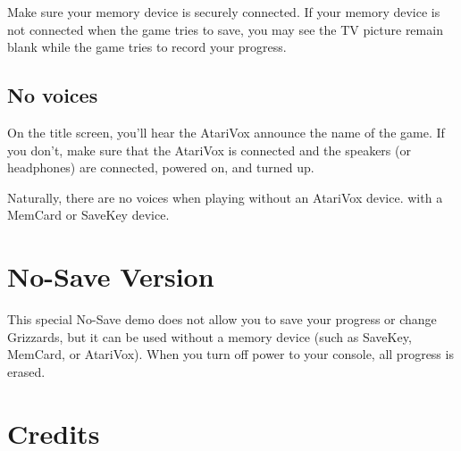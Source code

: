 \documentclass[10pt,twocolumn,openany,article]{memoir}
\begin{document}
Make  sure your  memory device  is  securely connected.  If your  memory
device is not connected when the game  tries to save, you may see the TV
picture remain blank while the game tries to record your progress.

\fi

\section{No voices}

On the title  screen, you'll hear the AtariVox announce  the name of the
game. If  you don't, make  sure that the  AtariVox is connected  and the
speakers (or headphones) are connected, powered on, and turned up.

Naturally,  there are  no  voices  when playing  \ifdefined\ATARIAGESAVE
without an AtariVox device. \else with a MemCard or SaveKey device. \fi

\fi

\ifdefined\NOSAVE

\columnbreak
\chapter{No-Save Version}

This special  No-Save demo does not  allow you to save  your progress or
change Grizzards,  but it can be  used without a memory  device (such as
SaveKey, MemCard, or AtariVox). When you turn off power to your console,
all progress is erased.

\fi

\fi %

\pagebreak
\chapter{Credits}
\end{document}

